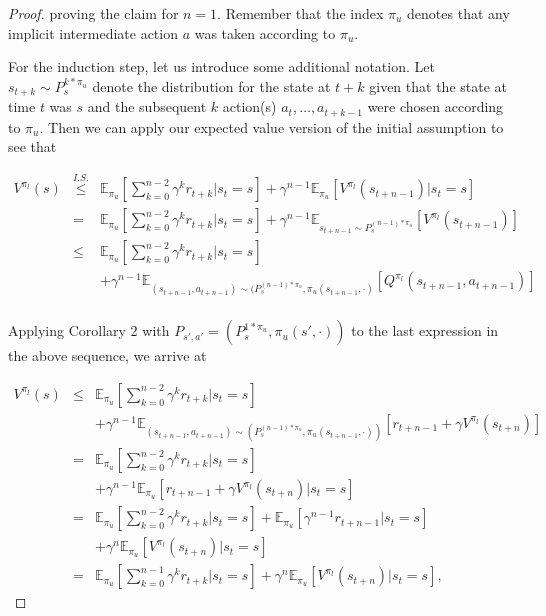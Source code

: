 \documentclass[11pt]{article} %
\begin{document}
\begin{proof}
	proving the claim for $n = 1$. Remember that the index $\pi_u$ denotes that any implicit intermediate action $a$ was taken according to $\pi_u$. 

	For the induction step, let us introduce some additional notation. Let $s_{t+k} \sim P_{s}^{k * \pi_u}$ denote the distribution for the state at $t+k$ given that the state at time $t$ was $s$ and the subsequent $k$ action(s) $a_t,\dots,a_{t+k-1}$ were chosen according to $\pi_u$. Then we can apply our expected value version of the initial assumption to see that

	\[
		\begin{array}{rll}
			V^{\pi_l}(s) & \overset{I.S.}{\le} & \mathbb{E}_{\pi_u}[\sum_{k=0}^{n-2} \gamma^k r_{t+k} | s_t = s] + \gamma^{n-1} \mathbb{E}_{\pi_u}[V^{\pi_l}(s_{t+n-1}) | s_t = s] \\
			& = & \mathbb{E}_{\pi_u}[\sum_{k=0}^{n-2} \gamma^k r_{t+k} | s_t = s] + \gamma^{n-1} \mathbb{E}_{s_{t+n-1} \sim P_s^{(n-1)*\pi_u}}[V^{\pi_l}(s_{t+n-1})] \\
			& \le & \mathbb{E}_{\pi_u}[\sum_{k=0}^{n-2} \gamma^k r_{t+k} | s_t = s] \\
			&  	& + \gamma^{n-1} \mathbb{E}_{(s_{t+n-1},a_{t+n-1}) \sim (P_s^{(n-1)*\pi_u},\pi_u(s_{t+n-1},\cdot)}[Q^{\pi_l}(s_{t+n-1},a_{t+n-1})] \\
		\end{array}
	\]

	Applying Corollary 2 with $P_{s',a'} = (P_s^{1 * \pi_u}, \pi_u(s',\cdot))$  to the last expression in the above sequence, we arrive at
	
	\[
		\begin{array}{rll}
		V^{\pi_l}(s) 	&	\le 	 & \mathbb{E}_{\pi_u}[\sum_{k=0}^{n-2} \gamma^k r_{t+k} | s_t = s] \\
					&		& + \gamma^{n-1} \mathbb{E}_{(s_{t+n-1},a_{t+n-1}) \sim (P_s^{(n-1)*\pi_u},\pi_u(s_{t+n-1},\cdot))}[r_{t+n-1} + \gamma V^{\pi_l}(s_{t+n})] \\
				 & = & \mathbb{E}_{\pi_u}[\sum_{k=0}^{n-2} \gamma^k r_{t+k} | s_t = s] \\
				& 	& + \gamma^{n-1} \mathbb{E}_{\pi_u}[r_{t+n-1} + \gamma V^{\pi_l}(s_{t+n}) | s_t = s] \\
				 & = & \mathbb{E}_{\pi_u}[\sum_{k=0}^{n-2} \gamma^k r_{t+k} | s_t = s]  + \mathbb{E}_{\pi_u}[\gamma^{n-1} r_{t+n-1} | s_t = s] \\
				&	& + \gamma^n \mathbb{E}_{\pi_u}[V^{\pi_l}(s_{t+n}) | s_t = s] \\
				& = & \mathbb{E}_{\pi_u}[\sum_{k=0}^{n-1} \gamma^k r_{t+k} | s_t = s] + \gamma^n \mathbb{E}_{\pi_u}[V^{\pi_l}(s_{t+n}) | s_t = s],
		\end{array}
	\]


\end{proof}
\end{document}
